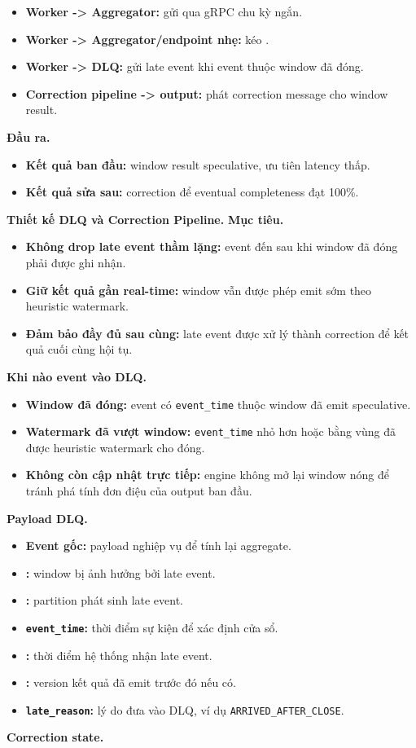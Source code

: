 \documentclass[12pt,a4paper]{article}
\begin{document}
\begin{itemize}
\item \textbf{Worker -> Aggregator:} gửi  qua gRPC chu kỳ ngắn.
\item \textbf{Worker -> Aggregator/endpoint nhẹ:} kéo .
\item \textbf{Worker -> DLQ:} gửi late event khi event thuộc window đã đóng.
\item \textbf{Correction pipeline -> output:} phát correction message cho window result.
\end{itemize}
\textbf{Đầu ra.}

\begin{itemize}
\item \textbf{Kết quả ban đầu:} window result speculative, ưu tiên latency thấp.
\item \textbf{Kết quả sửa sau:} correction để eventual completeness đạt 100\%.
\end{itemize}
\textbf{Thiết kế DLQ và Correction Pipeline.}
\textbf{Mục tiêu.}

\begin{itemize}
\item \textbf{Không drop late event thầm lặng:} event đến sau khi window đã đóng phải được ghi nhận.
\item \textbf{Giữ kết quả gần real-time:} window vẫn được phép emit sớm theo heuristic watermark.
\item \textbf{Đảm bảo đầy đủ sau cùng:} late event được xử lý thành correction để kết quả cuối cùng hội tụ.
\end{itemize}
\textbf{Khi nào event vào DLQ.}

\begin{itemize}
\item \textbf{Window đã đóng:} event có \texttt{event\_time} thuộc window đã emit speculative.
\item \textbf{Watermark đã vượt window:} \texttt{event\_time} nhỏ hơn hoặc bằng vùng đã được heuristic watermark cho đóng.
\item \textbf{Không còn cập nhật trực tiếp:} engine không mở lại window nóng để tránh phá tính đơn điệu của output ban đầu.
\end{itemize}
\textbf{Payload DLQ.}

\begin{itemize}
\item \textbf{Event gốc:} payload nghiệp vụ để tính lại aggregate.
\item \textbf{:} window bị ảnh hưởng bởi late event.
\item \textbf{:} partition phát sinh late event.
\item \textbf{\texttt{event\_time}:} thời điểm sự kiện để xác định cửa sổ.
\item \textbf{:} thời điểm hệ thống nhận late event.
\item \textbf{:} version kết quả đã emit trước đó nếu có.
\item \textbf{\texttt{late\_reason}:} lý do đưa vào DLQ, ví dụ \texttt{ARRIVED\_AFTER\_CLOSE}.
\end{itemize}
\textbf{Correction state.}
\end{document}
